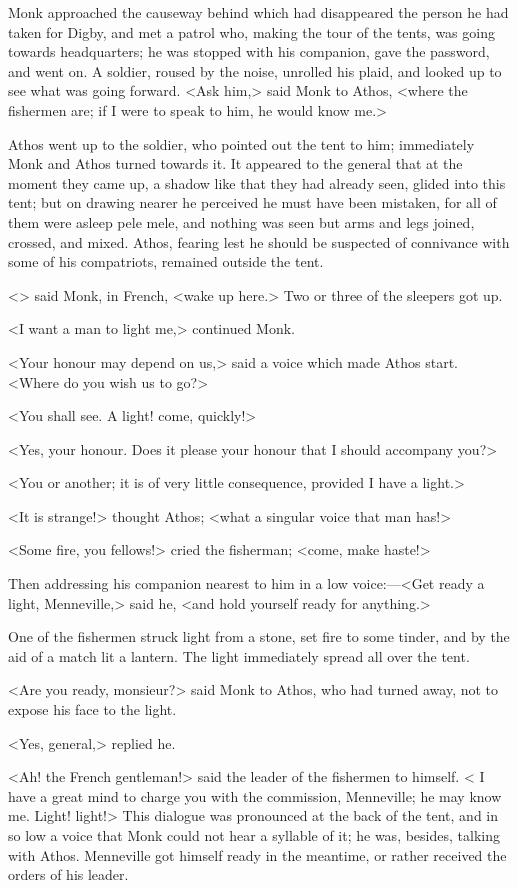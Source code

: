 Monk approached the causeway behind which had disappeared the person he had taken for Digby, and met a patrol who, making the tour of the tents, was going towards headquarters; he was stopped with his companion, gave the password, and went on. A soldier, roused by the noise, unrolled his plaid, and looked up to see what was going forward. <Ask him,> said Monk to Athos, <where the fishermen are; if I were to speak to him, he would know me.>

Athos went up to the soldier, who pointed out the tent to him; immediately Monk and Athos turned towards it. It appeared to the general that at the moment they came up, a shadow like that they had already seen, glided into this tent; but on drawing nearer he perceived he must have been mistaken, for all of them were asleep pele mele, and nothing was seen but arms and legs joined, crossed, and mixed. Athos, fearing lest he should be suspected of connivance with some of his compatriots, remained outside the tent.

<> said Monk, in French, <wake up here.> Two or three of the sleepers got up.

<I want a man to light me,> continued Monk.

<Your honour may depend on us,> said a voice which made Athos start. <Where do you wish us to go?>

<You shall see. A light! come, quickly!>

<Yes, your honour. Does it please your honour that I should accompany you?>

<You or another; it is of very little consequence, provided I have a light.>

<It is strange!> thought Athos; <what a singular voice that man has!>

<Some fire, you fellows!> cried the fisherman; <come, make haste!>

Then addressing his companion nearest to him in a low voice:—<Get ready a light, Menneville,> said he, <and hold yourself ready for anything.>

One of the fishermen struck light from a stone, set fire to some tinder, and by the aid of a match lit a lantern. The light immediately spread all over the tent.

<Are you ready, monsieur?> said Monk to Athos, who had turned away, not to expose his face to the light.

<Yes, general,> replied he.

<Ah! the French gentleman!> said the leader of the fishermen to himself. < I have a great mind to charge you with the commission, Menneville; he may know me. Light! light!> This dialogue was pronounced at the back of the tent, and in so low a voice that Monk could not hear a syllable of it; he was, besides, talking with Athos. Menneville got himself ready in the meantime, or rather received the orders of his leader.

